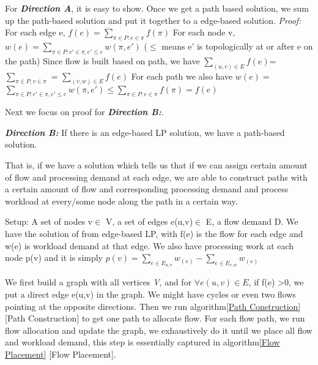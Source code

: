 \documentclass{sig-alternate}
\begin{document}
For \textbf{\textit{Direction A}}, it is easy to show. Once we get a path based solution, we sum up the path-based solution and put it together to a edge-based solution.
\newline
\textit{Proof:}
\newline
For each edge e, $f(e) =\sum\limits_{\pi\in P: e\in \pi} f(\pi)$
\newline
For each node v, $w(e) = \sum\limits_{\pi\in P: e'\in \pi, e' \leq e} w(\pi, e')$ ($\leq$ means e' is topologically at or after e on the path)
\newline
Since flow is built based on path, we have $ \sum\limits_{(u,v)\in E} f(e) $=$ \sum\limits_{\pi\in P, v\in \pi}$ = $\sum\limits_{(v,w )\in E} f(e)$\newline
For each path we also have $w(e) =$ 
$ \sum\limits_{\pi\in P: e'\in \pi, e' \leq e} w(\pi, e')\leq \sum\limits_{\pi\in P: e\in \pi} f(\pi) = f(e)  $\newline

Next we focus on proof for \textbf{\textit{Direction B:}}.

\textbf{\textit{Direction B:}} If there is an edge-based LP solution, we have a path-based solution.

That is, if we have a solution which tells us that if we can assign certain amount of flow and processing 
demand at each edge, we are able to construct paths with a certain amount of flow 
and corresponding processing demand and process workload at every/some node along the path in a certain way. 

Setup:
A set of nodes  v$\in$ V, a set of edges e(u,v)$\in$ E, a flow demand D. We have the solution of from edge-based LP, with 
f(e) is the flow for each edge and w(e) is workload demand at that edge. We also have processing work at each node p(v) and it is simply $p(v) = 
\sum\limits_{e \in E_{u, v} }w_(e) - \sum\limits_{e \in E_{v, w} }w_(e)  $


We first build a graph with all vertices \textit{V}, and for $\forall e(u,v) \in E $, if f(e) >0, we put a direct edge e(u,v) in the graph. We might have cycles or even two flows pointing at the opposite directions. Then we run algorithm\ref{Path Construction} [Path Construction] to get one path to allocate flow. For each flow path, we run flow allocation and update the graph, we exhaustively do it until we place all flow and workload demand, this step is essentially captured in algorithm\ref{Flow Placement} [Flow Placement]. 
\newline
\end{document}

